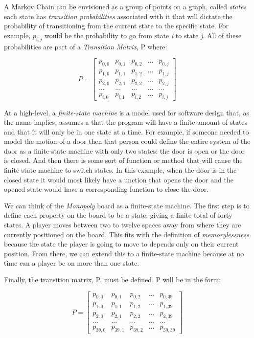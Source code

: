 \documentclass{article}
\begin{document}
A Markov Chain can be envisioned as a group of points on a graph, called \textit{states} each state has \textit{transition probabilities} associated with it that will dictate the probability of transitioning from the current state to the specific state.  For example,  $p_{i,j}$ would be the probability to go from state \textit{i} to state \textit{j}.  All of these probabilities are part of a \textit{Transition Matrix}, P where:

$$
P=
\begin{bmatrix}
p_{0,0} & p_{0,1} & p_{0,2} & ... & p_{0,j}\\
p_{1,0} & p_{1,1} & p_{1,2} & ... & p_{1,j}\\
p_{2,0} & p_{2,1} & p_{2,2} & ... & p_{2,j}\\
... & ... & ... & ... & ...\\
p_{i,0} & p_{i,1} & p_{i,2} & ... & p_{i,j}
\end{bmatrix}
$$

At a high-level, a \textit{finite-state machine} is a model used for software design that, as the name implies, assumes a that the program will have a finite amount of states and that it will only be in one state at a time.  For example, if someone needed to model the motion of a door then that person could define the entire system of the door as a finite-state machine with only two states: the door is open or the door is closed.  And then there is some sort of function or method that will cause the finite-state machine to switch states.  In this example, when the door is in the closed state it would most likely have a unction that opens the door and the opened state would have a corresponding function to close the door.

We can think of the \textit{Monopoly} board as a finite-state machine.  The first step is to define each property on the board to be a state, giving a finite total of forty states.  A player moves between two to twelve spaces away from where they are currently positioned on the board.  This fits with the definition of \textit{memorylessness} because the state the player is going to move to depends only on their current position.  From there, we can extend this to a finite-state machine because at no time can a player be on more than one state.

Finally, the transition matrix, P, must be defined.  P will be in the form:

$$
P=
\begin{bmatrix}
p_{0,0} & p_{0,1} & p_{0,2} & ... & p_{0,39}\\
p_{1,0} & p_{1,1} & p_{1,2} & ... & p_{1,39}\\
p_{2,0} & p_{2,1} & p_{2,2} & ... & p_{2,39}\\
... & ... & ... & ... & ...\\
p_{39,0} & p_{39,1} & p_{39,2} & ... & p_{39,39}
\end{bmatrix}
$$
\end{document}

